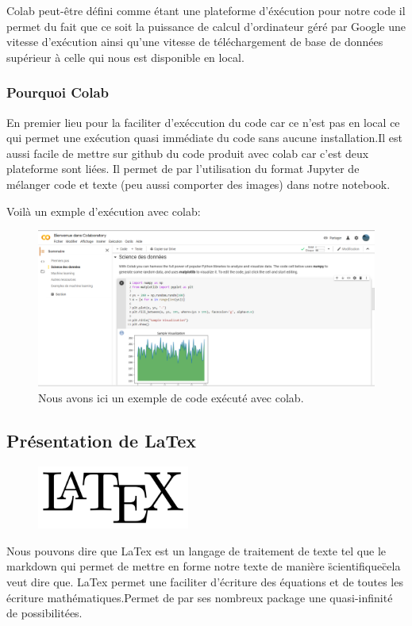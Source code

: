 Colab peut-être défini comme étant une plateforme d'éxécution pour notre code
il permet du fait que ce soit la puissance de calcul d'ordinateur géré par Google une vitesse d'exécution ainsi qu'une vitesse de téléchargement de base de données supérieur à celle qui nous est disponible en local.

\subsubsection{Pourquoi Colab}
En premier lieu pour la faciliter d'exéccution du code car ce n'est pas en local ce qui permet une exécution quasi immédiate du code sans aucune installation.Il est aussi facile de mettre sur github du code produit avec colab car c'est deux plateforme sont liées. Il permet de par l'utilisation du format Jupyter de mélanger code et texte (peu aussi comporter des images) dans notre notebook.

Voilà un exmple d'exécution avec colab:

\begin{figure}[h]
\begin{center}
\includegraphics[width=15cm]{./images/Cap_colab.PNG}
\caption{Nous avons ici un exemple de code exécuté avec colab.}
\end{center}
\end{figure}


\subsection{Présentation de LaTex}

\begin{figure}[h]
  \begin{center}
\includegraphics[width=5cm]{./images/Latex.png}
\end{center}
\end{figure}

Nous pouvons dire que LaTex est un langage de traitement de texte tel que le markdown qui permet de mettre en forme notre texte de manière \"scientifique\" cela veut dire que. LaTex permet une faciliter d'écriture des équations et de toutes les écriture mathématiques.Permet de par ses nombreux package une quasi-infinité de possibilitées.
